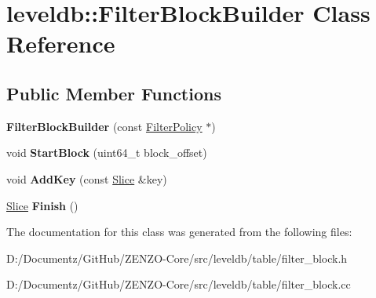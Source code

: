 \hypertarget{classleveldb_1_1_filter_block_builder}{}\section{leveldb\+::Filter\+Block\+Builder Class Reference}
\label{classleveldb_1_1_filter_block_builder}
\subsection*{Public Member Functions}
\begin{DoxyCompactItemize}
\item 
\mbox{\label{classleveldb_1_1_filter_block_builder_a8e8b5ae95df5a13c035bec85e22549ca}} 
{\bfseries Filter\+Block\+Builder} (const \mbox{\hyperlink{classleveldb_1_1_filter_policy}{Filter\+Policy}} $\ast$)
\item 
\mbox{\label{classleveldb_1_1_filter_block_builder_a766a753a200f7386196a68897e47c1c3}} 
void {\bfseries Start\+Block} (uint64\+\_\+t block\+\_\+offset)
\item 
\mbox{\label{classleveldb_1_1_filter_block_builder_a4fd9db735c5c72973cec62e4fd98137d}} 
void {\bfseries Add\+Key} (const \mbox{\hyperlink{classleveldb_1_1_slice}{Slice}} \&key)
\item 
\mbox{\label{classleveldb_1_1_filter_block_builder_a75fa127d8af42e749abdd235eed97cad}} 
\mbox{\hyperlink{classleveldb_1_1_slice}{Slice}} {\bfseries Finish} ()
\end{DoxyCompactItemize}


The documentation for this class was generated from the following files\+:\begin{DoxyCompactItemize}
\item 
D\+:/\+Documentz/\+Git\+Hub/\+Z\+E\+N\+Z\+O-\/\+Core/src/leveldb/table/filter\+\_\+block.\+h\item 
D\+:/\+Documentz/\+Git\+Hub/\+Z\+E\+N\+Z\+O-\/\+Core/src/leveldb/table/filter\+\_\+block.\+cc\end{DoxyCompactItemize}
